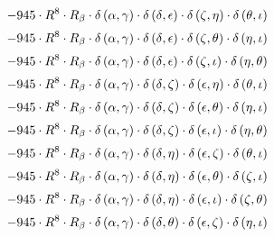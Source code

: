 \begin{subequations}
\begin{gather}
 \\[0.2em] \notag 		 - 945 \cdot R^{8} \cdot R_{\beta{}} \cdot \delta{}\left(\alpha{}, \gamma{}\right) \cdot \delta{}\left(\delta{}, \epsilon{}\right) \cdot \delta{}\left(\zeta{}, \eta{}\right) \cdot \delta{}\left(\theta{}, \iota{}\right) 
 \\[0.2em] \notag 		 - 945 \cdot R^{8} \cdot R_{\beta{}} \cdot \delta{}\left(\alpha{}, \gamma{}\right) \cdot \delta{}\left(\delta{}, \epsilon{}\right) \cdot \delta{}\left(\zeta{}, \theta{}\right) \cdot \delta{}\left(\eta{}, \iota{}\right) 
 \\[0.2em] \notag 		 - 945 \cdot R^{8} \cdot R_{\beta{}} \cdot \delta{}\left(\alpha{}, \gamma{}\right) \cdot \delta{}\left(\delta{}, \epsilon{}\right) \cdot \delta{}\left(\zeta{}, \iota{}\right) \cdot \delta{}\left(\eta{}, \theta{}\right) 
 \\[0.2em] \notag 		 - 945 \cdot R^{8} \cdot R_{\beta{}} \cdot \delta{}\left(\alpha{}, \gamma{}\right) \cdot \delta{}\left(\delta{}, \zeta{}\right) \cdot \delta{}\left(\epsilon{}, \eta{}\right) \cdot \delta{}\left(\theta{}, \iota{}\right) 
 \\[0.2em] \notag 		 - 945 \cdot R^{8} \cdot R_{\beta{}} \cdot \delta{}\left(\alpha{}, \gamma{}\right) \cdot \delta{}\left(\delta{}, \zeta{}\right) \cdot \delta{}\left(\epsilon{}, \theta{}\right) \cdot \delta{}\left(\eta{}, \iota{}\right) 
 \\[0.2em] \notag 		 - 945 \cdot R^{8} \cdot R_{\beta{}} \cdot \delta{}\left(\alpha{}, \gamma{}\right) \cdot \delta{}\left(\delta{}, \zeta{}\right) \cdot \delta{}\left(\epsilon{}, \iota{}\right) \cdot \delta{}\left(\eta{}, \theta{}\right) 
 \\[0.2em] \notag 		 - 945 \cdot R^{8} \cdot R_{\beta{}} \cdot \delta{}\left(\alpha{}, \gamma{}\right) \cdot \delta{}\left(\delta{}, \eta{}\right) \cdot \delta{}\left(\epsilon{}, \zeta{}\right) \cdot \delta{}\left(\theta{}, \iota{}\right) 
 \\[0.2em] \notag 		 - 945 \cdot R^{8} \cdot R_{\beta{}} \cdot \delta{}\left(\alpha{}, \gamma{}\right) \cdot \delta{}\left(\delta{}, \eta{}\right) \cdot \delta{}\left(\epsilon{}, \theta{}\right) \cdot \delta{}\left(\zeta{}, \iota{}\right) 
 \\[0.2em] \notag 		 - 945 \cdot R^{8} \cdot R_{\beta{}} \cdot \delta{}\left(\alpha{}, \gamma{}\right) \cdot \delta{}\left(\delta{}, \eta{}\right) \cdot \delta{}\left(\epsilon{}, \iota{}\right) \cdot \delta{}\left(\zeta{}, \theta{}\right) 
 \\[0.2em] \notag 		 - 945 \cdot R^{8} \cdot R_{\beta{}} \cdot \delta{}\left(\alpha{}, \gamma{}\right) \cdot \delta{}\left(\delta{}, \theta{}\right) \cdot \delta{}\left(\epsilon{}, \zeta{}\right) \cdot \delta{}\left(\eta{}, \iota{}\right) 

\end{gather}
\end{subequations}
